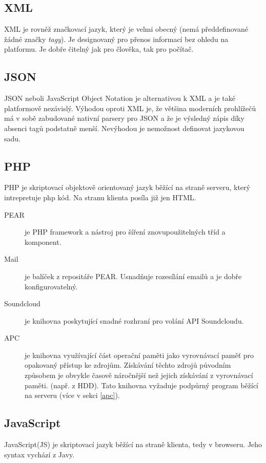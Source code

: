 \documentclass[12pt]{article}
\begin{document}
\subsection{XML}
XML je rovněž značkovací jazyk, který je velmi obecný (nemá předdefinované žádné značky \emph{tagy}). Je designovaný pro přenos informací bez ohledu na platformu. Je dobře čitelný jak pro člověka, tak pro počítač.

\subsection{JSON}
JSON neboli JavaScript Object Notation je alternativou k XML a je také platformově nezávislý. Výhodou oproti XML je, že většina moderních prohlížečů má v sobě zabudované nativní parsery pro JSON a že je výsledný zápis díky absenci tagů podstatně menší. Nevýhodou je nemožnost definovat jazykovou sadu.

\subsection{PHP}
PHP je skriptovací objektově orientovaný jazyk běžící na straně serveru, který intrepretuje php kód. Na stranu klienta posíla již jen HTML.

\begin{description}
\item[PEAR] je PHP framework a nástroj pro šíření znovupoužitelných tříd a komponent.
\item[Mail] je balíček z repositáře PEAR. Usnadňuje rozesílání emailů a je dobře konfigurovatelný.
\item[Soundcloud] je knihovna poskytující snadné rozhraní pro volání API Soundcloudu.
\item[APC] je knihovna využívající část operační paměti jako vyrovnávací paměť pro opakovaný přístup ke zdrojům. Získávání těchto zdrojů původním způsobem je obvykle časově náročnější než jejich získávání z vyrovnávací paměti. (např. z HDD). Tato knihovna vyžaduje podpůrný program běžící na serveru (více v sekci \ref{apc}).
\end{description}

\subsection{JavaScript}
JavaScript(JS) je skriptovací jazyk běžící na straně klienta, tedy v browseru. Jeho syntax vychází z Javy.
\end{document}
